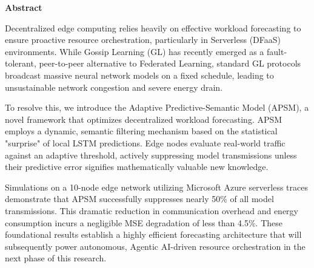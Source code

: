 \begin{center}
	{\bf{Abstract}}
\end{center}
\vspace{0.2in}
{\em{\noindent
Decentralized edge computing relies heavily on effective workload forecasting to ensure proactive resource orchestration, particularly in Serverless (DFaaS) environments. While Gossip Learning (GL) has recently emerged as a fault-tolerant, peer-to-peer alternative to Federated Learning, standard GL protocols broadcast massive neural network models on a fixed schedule, leading to unsustainable network congestion and severe energy drain. 

To resolve this, we introduce the Adaptive Predictive-Semantic Model (APSM), a novel framework that optimizes decentralized workload forecasting. APSM employs a dynamic, semantic filtering mechanism based on the statistical "surprise" of local LSTM predictions. Edge nodes evaluate real-world traffic against an adaptive threshold, actively suppressing model transmissions unless their predictive error signifies mathematically valuable new knowledge. 

Simulations on a 10-node edge network utilizing Microsoft Azure serverless traces demonstrate that APSM successfully suppresses nearly 50\% of all model transmissions. This dramatic reduction in communication overhead and energy consumption incurs a negligible MSE degradation of less than 4.5\%. These foundational results establish a highly efficient forecasting architecture that will subsequently power autonomous, Agentic AI-driven resource orchestration in the next phase of this research.
}}

